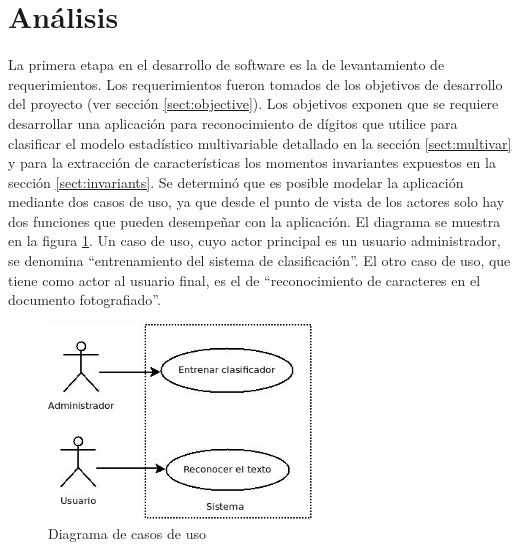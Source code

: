 \documentclass[a4paper, 11pt, oneside]{report}
\begin{document}
\section{Análisis}
La primera etapa en el desarrollo de software es la de levantamiento de requerimientos. Los requerimientos fueron tomados de los objetivos de desarrollo del proyecto (ver sección \ref{sect:objective}). Los objetivos exponen que se requiere desarrollar una aplicación para reconocimiento de dígitos que utilice para clasificar el modelo estadístico multivariable detallado en la sección \ref{sect:multivar} y para la extracción de características los momentos invariantes expuestos en la sección \ref{sect:invariants}.
Se determinó que es posible modelar la aplicación mediante dos casos de uso, ya que desde el punto de vista de los actores solo hay dos funciones que pueden desempeñar con la aplicación. El diagrama se muestra en la figura \ref{fig:useCase}. Un caso de uso, cuyo actor principal es un usuario administrador, se denomina ``entrenamiento del sistema de clasificación''. El otro caso de uso, que tiene como actor al usuario final, es el de ``reconocimiento de caracteres en el documento fotografiado''.
\begin{figure}[htb]
\begin{center}
\leavevmode
\includegraphics[width=7cm]{diagrams/casoUso.jpg}
\end{center}
\caption{Diagrama de casos de uso}
\label{fig:useCase}
\end{figure}
\end{document}
